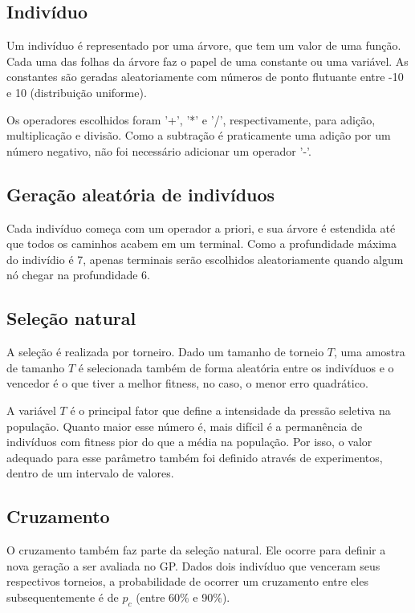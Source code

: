 \documentclass[11pt]{article}
\begin{document}
\subsection*{Indivíduo}

Um indivíduo é representado por uma árvore, que tem um valor de uma função. Cada uma das folhas da árvore faz o papel de uma constante ou uma variável. As constantes são geradas aleatoriamente com números de ponto flutuante entre -10 e 10 (distribuição uniforme).

Os operadores escolhidos foram '+', '*' e '/', respectivamente, para adição, multiplicação e divisão. Como a subtração é praticamente uma adição por um número negativo, não foi necessário adicionar um operador '-'. 

\subsection*{Geração aleatória de indivíduos}

Cada indivíduo começa com um operador a priori, e sua árvore é estendida até que todos os caminhos acabem em um terminal. Como a profundidade máxima do indivídio é 7, apenas terminais serão escolhidos aleatoriamente quando algum nó chegar na profundidade 6.

\subsection*{Seleção natural}

A seleção é realizada por torneiro. Dado um tamanho de torneio $T$, uma amostra de tamanho $T$ é selecionada também de forma aleatória entre os indivíduos e o vencedor é o que tiver a melhor fitness, no caso, o menor erro quadrático. 

A variável $T$ é o principal fator que define a intensidade da pressão seletiva na população. Quanto maior esse número é, mais difícil é a permanência de indivíduos com fitness pior do que a média na população. Por isso, o valor adequado para esse parâmetro também foi definido através de experimentos, dentro de um intervalo de valores.

\subsection*{Cruzamento}

O cruzamento também faz parte da seleção natural. Ele ocorre para definir a nova geração a ser avaliada no GP. Dados dois indivíduo que venceram seus respectivos torneios, a probabilidade de ocorrer um cruzamento entre eles subsequentemente é de $p_c$ (entre 60\% e 90\%).
\end{document}
